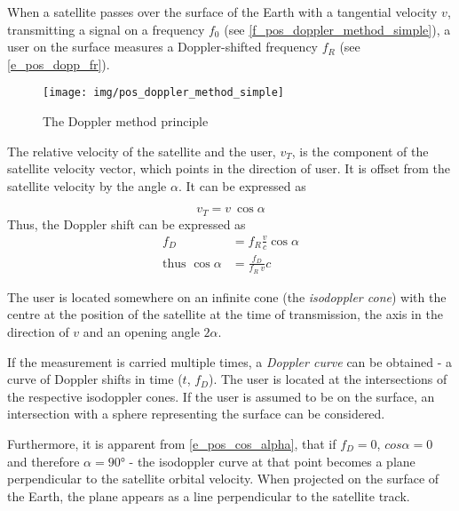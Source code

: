 When a satellite passes over the surface of the Earth with a tangential velocity $v$, transmitting a signal on a frequency $f_0$ (see \autoref{f_pos_doppler_method_simple}), a user on the surface measures a Doppler-shifted frequency $f_R$ (see \autoref{e_pos_dopp_fr}).

\begin{figure}
    \centering
    \texttt{[image: img/pos\_doppler\_method\_simple]}
    \caption{The Doppler method principle}
    \label{f_pos_doppler_method_simple}
\end{figure}

The relative velocity of the satellite and the user, $v_T$, is the component of the satellite velocity vector, which points in the direction of user. It is offset from the satellite velocity by the angle $\alpha$. It can be expressed as

\begin{equation*}
    v_T = v \ \cos{\alpha}
\end{equation*}
Thus, the Doppler shift can be expressed as
\begin{align}
    \label{e_pos_fd_alpha}
    f_D &= f_R \frac{v}{c} \cos{\alpha} \\
    \label{e_pos_cos_alpha}
    \text{thus } \cos{\alpha} &= \frac{f_D}{f_R \ v}c
\end{align}

The user is located somewhere on an infinite cone (the \textit{isodoppler cone}) with the centre at the position of the satellite at the time of transmission, the axis in the direction of $v$ and an opening angle $2\alpha$.

If the measurement is carried multiple times, a \textit{Doppler curve} can be obtained - a curve of Doppler shifts in time ($t$, $f_D$). The user is located at the intersections of the respective isodoppler cones. If the user is assumed to be on the surface, an intersection with a sphere representing the surface can be considered.

Furthermore, it is apparent from \autoref{e_pos_cos_alpha}, that if $f_D = 0$, $cos \alpha = 0$ and therefore $\alpha = \ang{90}$ - the isodoppler curve at that point becomes a plane perpendicular to the satellite orbital velocity. When projected on the surface of the Earth, the plane appears as a line perpendicular to the satellite track.

